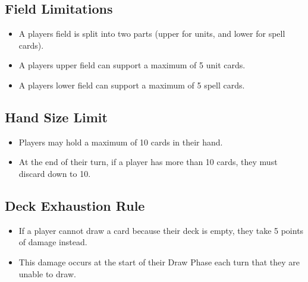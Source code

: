 \subsection{Field Limitations}
\begin{itemize}
    \item A players field is split into two parts (upper for units, and lower for spell cards).
    \item A players upper field can support a maximum of 5 unit cards.
    \item A players lower field can support a maximum of 5 spell cards.
\end{itemize}








\subsection{Hand Size Limit}
\begin{itemize}
    \item Players may hold a maximum of 10 cards in their hand.
    \item At the end of their turn, if a player has more than 10 cards, they must discard down to 10.
\end{itemize}







\subsection{Deck Exhaustion Rule}
\begin{itemize}
    \item If a player cannot draw a card because their deck is empty, they take 5 points of damage instead.
    \item This damage occurs at the start of their Draw Phase each turn that they are unable to draw.
\end{itemize}




